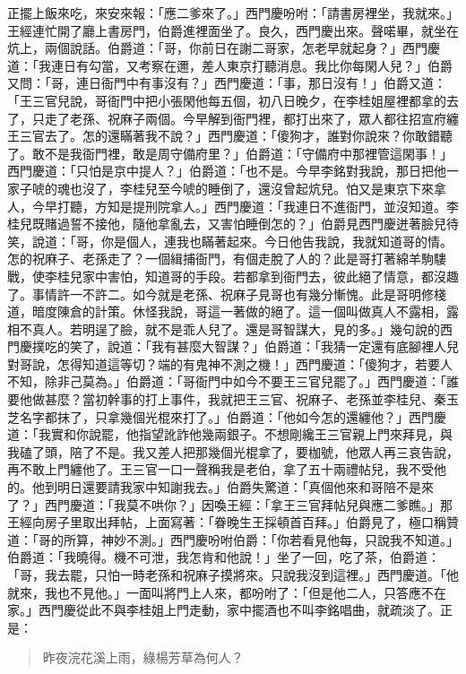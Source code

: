 正擺上飯來吃，來安來報：「應二爹來了。」西門慶吩咐：「請書房裡坐，我就來。」王經連忙開了廳上書房門，伯爵進裡面坐了。良久，西門慶出來。聲喏畢，就坐在炕上，兩個說話。伯爵道：「哥，你前日在謝二哥家，怎老早就起身？」西門慶道：「我連日有勾當，又考察在邇，差人東京打聽消息。我比你每閑人兒？」伯爵又問：「哥，連日衙門中有事沒有？」西門慶道：「事，那日沒有！」伯爵又道：「王三官兒說，哥衙門中把小張閑他每五個，初八日晚夕，在李桂姐屋裡都拿的去了，只走了老孫、祝麻子兩個。今早解到衙門裡，都打出來了，眾人都往招宣府纏王三官去了。怎的還瞞著我不說？」西門慶道：「傻狗才，誰對你說來？你敢錯聽了。敢不是我衙門裡，敢是周守備府里？」伯爵道：「守備府中那裡管這閑事！」西門慶道：「只怕是京中提人？」伯爵道：「也不是。今早李銘對我說，那日把他一家子唬的魂也沒了，李桂兒至今唬的睡倒了，還沒曾起炕兒。怕又是東京下來拿人，今早打聽，方知是提刑院拿人。」西門慶道：「我連日不進衙門，並沒知道。李桂兒既賭過誓不接他，隨他拿亂去，又害怕睡倒怎的？」伯爵見西門慶迸著臉兒待笑，說道：「哥，你是個人，連我也瞞著起來。今日他告我說，我就知道哥的情。怎的祝麻子、老孫走了？一個緝捕衙門，有個走脫了人的？此是哥打著綿羊駒䮫戰，使李桂兒家中害怕，知道哥的手段。若都拿到衙門去，彼此絕了情意，都沒趣了。事情許一不許二。如今就是老孫、祝麻子見哥也有幾分慚愧。此是哥明修棧道，暗度陳倉的計策。休怪我說，哥這一著做的絕了。這一個叫做真人不露相，露相不真人。若明逞了臉，就不是乖人兒了。還是哥智謀大，見的多。」幾句說的西門慶撲吃的笑了，說道：「我有甚麼大智謀？」伯爵道：「我猜一定還有底腳裡人兒對哥說，怎得知道這等切？端的有鬼神不測之機！」西門慶道：「傻狗才，若要人不知，除非己莫為。」伯爵道：「哥衙門中如今不要王三官兒罷了。」西門慶道：「誰要他做甚麼？當初幹事的打上事件，我就把王三官、祝麻子、老孫並李桂兒、秦玉芝名字都抹了，只拿幾個光棍來打了。」伯爵道：「他如今怎的還纏他？」西門慶道：「我實和你說罷，他指望訛詐他幾兩銀子。不想剛纔王三官親上門來拜見，與我磕了頭，陪了不是。我又差人把那幾個光棍拿了，要枷號，他眾人再三哀告說，再不敢上門纏他了。王三官一口一聲稱我是老伯，拿了五十兩禮帖兒，我不受他的。他到明日還要請我家中知謝我去。」伯爵失驚道：「真個他來和哥陪不是來了？」西門慶道：「我莫不哄你？」因喚王經：「拿王三官拜帖兒與應二爹瞧。」那王經向房子里取出拜帖，上面寫著：「眷晚生王採頓首百拜。」伯爵見了，極口稱贊道：「哥的所算，神妙不測。」西門慶吩咐伯爵：「你若看見他每，只說我不知道。」伯爵道：「我曉得。機不可泄，我怎肯和他說！」坐了一回，吃了茶，伯爵道：「哥，我去罷，只怕一時老孫和祝麻子摸將來。只說我沒到這裡。」西門慶道。「他就來，我也不見他。」一面叫將門上人來，都吩咐了：「但是他二人，只答應不在家。」西門慶從此不與李桂姐上門走動，家中擺酒也不叫李銘唱曲，就疏淡了。正是：
\begin{quote}
昨夜浣花溪上雨，綠楊芳草為何人？
\end{quote}
